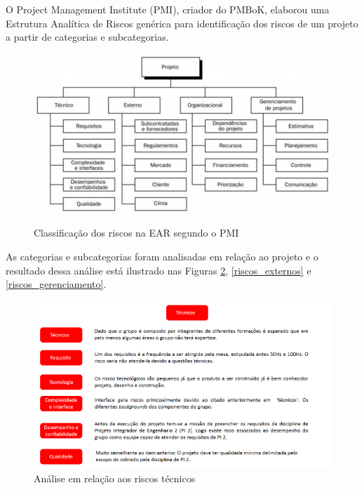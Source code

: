 \begin{apendicesenv}
  O Project Management Institute (PMI), criador do PMBoK, elaborou uma Estrutura Analítica de Riscos genérica para identificação dos riscos de um projeto a partir de categorias e subcategorias.
  \begin{figure}[h]
    \begin{center}
    \includegraphics[scale=0.65]{figuras/ear_padrao.png}
    \label{ear_padrao}
    \end{center}
    \caption{Classificação dos riscos na EAR segundo o PMI}
  \end{figure}

As categorias e subcategorias foram analisadas em relação ao projeto e o resultado dessa análise está ilustrado nas Figuras \ref{riscos_tecnicos}, \ref{riscos_externos} e \ref{riscos_gerenciamento}.

  \begin{figure}[h]
    \begin{center}
    \includegraphics[scale=0.65]{figuras/riscos_tecnicos.png}
    \end{center}
    \label{riscos_tecnicos}
    \caption{Análise em relação aos riscos técnicos}
  \end{figure}
  

\end{apendicesenv}
